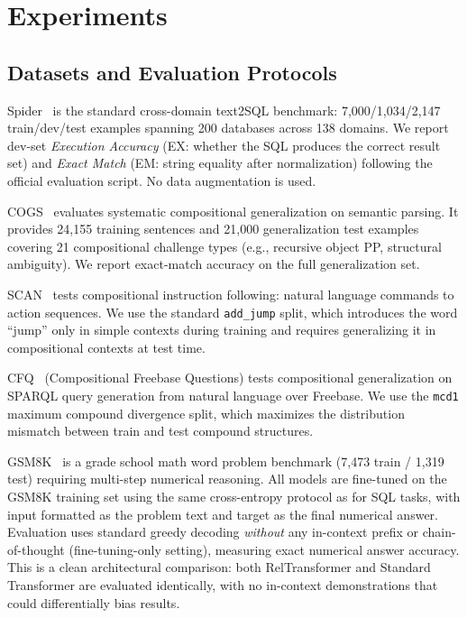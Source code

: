 \documentclass[review]{elsarticle}
\begin{document}
\section{Experiments}
\label{sec:experiments}

\subsection{Datasets and Evaluation Protocols}

{Spider}~\cite{yu2018spider} is the standard cross-domain text2SQL benchmark: 7,000/1,034/2,147 train/dev/test examples spanning 200 databases across 138 domains. We report dev-set \emph{Execution Accuracy} (EX: whether the SQL produces the correct result set) and \emph{Exact Match} (EM: string equality after normalization) following the official evaluation script. No data augmentation is used.

{COGS}~\cite{kim2020cogs} evaluates systematic compositional generalization on semantic parsing. It provides 24,155 training sentences and 21,000 generalization test examples covering 21 compositional challenge types (e.g., recursive object PP, structural ambiguity). We report exact-match accuracy on the full generalization set.

{SCAN}~\cite{lake2018scan} tests compositional instruction following: natural language commands to action sequences. We use the standard \texttt{add\_jump} split, which introduces the word ``jump'' only in simple contexts during training and requires generalizing it in compositional contexts at test time.

{CFQ}~\cite{keysers2020measuring} (Compositional Freebase Questions) tests compositional generalization on SPARQL query generation from natural language over Freebase. We use the \texttt{mcd1} maximum compound divergence split, which maximizes the distribution mismatch between train and test compound structures.

{GSM8K}~\cite{yuan2023scaling} is a grade school math word problem benchmark (7,473 train / 1,319 test) requiring multi-step numerical reasoning. All models are fine-tuned on the GSM8K training set using the same cross-entropy protocol as for SQL tasks, with input formatted as the problem text and target as the final numerical answer. Evaluation uses standard greedy decoding \emph{without} any in-context prefix or chain-of-thought (fine-tuning-only setting), measuring exact numerical answer accuracy. This is a clean architectural comparison: both RelTransformer and Standard Transformer are evaluated identically, with no in-context demonstrations that could differentially bias results.
\end{document}
